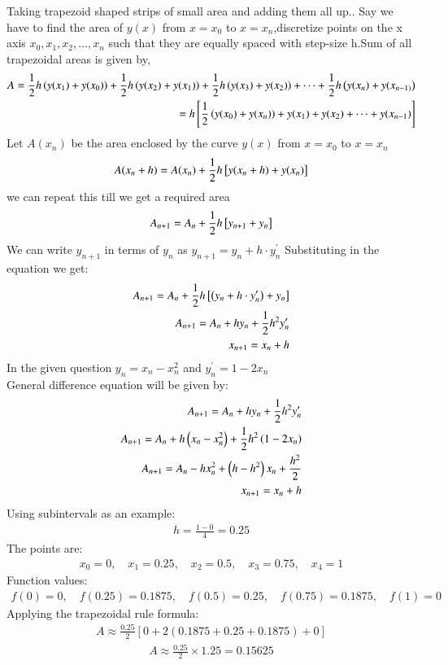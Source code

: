 \documentclass[journal]{IEEEtran}
\begin{document}
Taking trapezoid shaped strips of small area and adding them all up.. Say we have to
find the area of $y(x)$ from $x=x_0$ to $x = x_n$,discretize points on the x axis $x_0,x_1,x_2,...,x_n$ such that they are equally spaced with step-size h.Sum of all trapezoidal areas is given by,
\begin{align}
    A = \frac{1}{2}h\left(y(x_1)+y(x_0)\right)+\frac{1}{2}h\left(y(x_2)+y(x_1)\right)+\frac{1}{2}h\left(y(x_3)+y(x_2)\right)+\dots+\frac{1}{2}h\left(y(x_n)+y(x_{n-1)}\right)\\
    = h{}\left[\frac{1}{2}\left(y(x_0)+y(x_n)\right)+y(x_1)+y(x_2)+\dots+y(x_{n-1})\right]
\end{align}
Let $A(x_n)$ be the area enclosed by the curve $y(x)$ from $x=x_0$ to $x=x_n$
\begin{align}
    A(x_{n}+h) = A(x_n) + \frac{1}{2}h{}\left[y(x_{n}+h)+y(x_n)\right]
\end{align}
we can repeat this till we get a required area
\begin{align}
    A_{n+1} = A_n + \frac{1}{2}h{}\left[y_{n+1}+y_n\right]
\end{align}
We can write $y_{n+1}$ in terms of $y_n$ as $y_{n+1} = y_n + h\cdot y^{\prime}_n$
Substituting in the equation we get:
\begin{align}
    A_{n+1} = A_n +\frac{1}{2}h{}\left[\left(y_n+h\cdot y^{\prime}_n\right)+y_n\right]\\
    A_{n+1} = A_n + hy_n + \frac{1}{2}h^2y^{\prime}_n\\
    x_{n+1} = x_n + h
\end{align}
In the given question $y_n = x_n - x^2_n$ and $y^{\prime}_n = 1-2x_n$\\
General difference equation will be given by:
\begin{align}
    A_{n+1} = A_n + hy_n + \frac{1}{2}h^2y^{\prime}_n\\
    A_{n+1} = A_n + h\left(x_n - x^2_n\right) + \frac{1}{2}h^2\left(1-2x_n\right)\\
    A_{n+1} = A_n - hx^2_n + \left(h-h^2\right)x_n + \frac{h^2}{2}\\
    x_{n+1} = x_n + h
\end{align}
Using  subintervals as an example:
\begin{align}
    h = \frac{1 - 0}{4} = 0.25
\end{align}
The points are: 
\begin{align}
    x_0 = 0, \quad x_1 = 0.25, \quad x_2 = 0.5, \quad x_3 = 0.75, \quad x_4 = 1
\end{align}
Function values:
\begin{align}
    f(0) = 0, \quad f(0.25) = 0.1875, \quad f(0.5) = 0.25, \quad f(0.75) = 0.1875, \quad f(1) = 0
\end{align}
Applying the trapezoidal rule formula:
\begin{align}
    A \approx \frac{0.25}{2} \left[0 + 2(0.1875 + 0.25 + 0.1875) + 0\right]
\end{align}
\begin{align}
    A \approx \frac{0.25}{2} \times 1.25 = 0.15625
\end{align}
\end{document}
